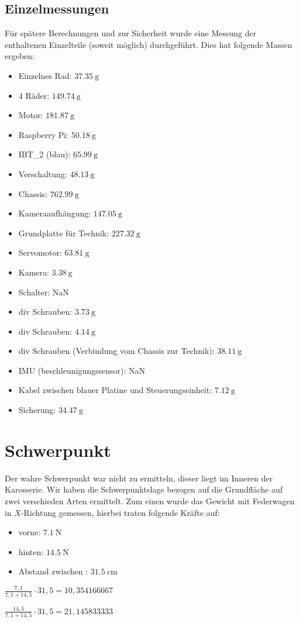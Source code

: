 \documentclass[11pt]{article}
\begin{document}
    \subsection{Einzelmessungen}
    Für spätere Berechnungen und zur Sicherheit wurde eine Messung der enthaltenen Einzelteile (soweit möglich) durchgeführt. Dies hat folgende Massen ergeben:
    \begin{multicols}{2}
    \begin{itemize}
        \item Einzelnes Rad: $\SI{37,35}{\gram}$
        \item 4 Räder: $\SI{149,74}{\gram}$
        \item Motor: $\SI{181,87}{\gram}$
        \item Raspberry Pi: $\SI{50,18}{\gram}$
        \item IBT\_2 (blau): $\SI{65,99}{\gram}$
        \item Verschaltung: $\SI{48,13}{\gram}$
        \item Chassis: $\SI{762,99}{\gram}$
        \item Kameraaufhängung: $\SI{147,05}{\gram}$
        \item Grundplatte für Technik: $\SI{227,32}{\gram}$
        \item Servomotor: $\SI{63,81}{\gram}$
        \item Kamera: $\SI{3,38}{\gram}$
        \item Schalter: NaN
        \item div Schrauben: $\SI{3,73}{\gram}$
        \item div Schrauben: $\SI{4,14}{\gram}$
        \item div Schrauben (Verbindung vom Chassis zur Technik): $\SI{38,11}{\gram}$
        \item IMU (beschleunigungssensor): NaN
        \item Kabel zwischen blauer Platine und Steuerungseinheit: $\SI{7,12}{\gram}$
        \item Sicherung: $\SI{34,47}{\gram}$
    \end{itemize}
    \end{multicols}

\section{Schwerpunkt}
    Der wahre Schwerpunkt war nicht zu ermitteln, dieser liegt im Inneren der Karosserie.
    Wir haben die Schwerpunktslage bezogen auf die Grundfläche auf zwei verschieden Arten ermittelt.
    Zum einen wurde das Gewicht mit Federwagen in $X$-Richtung gemessen, hierbei traten folgende Kräfte auf:
    \begin{itemize}
    \item vorne: $\SI{7,1}{\newton}$
    \item hinten: $\SI{14,5}{\newton}$
    \item Abstand zwischen : $\SI{31,5}{\cm}$
    \end{itemize}
    \item $\frac{7,1}{7,1+14,5}\cdot 31,5 = 10,354166667$
    \item $\frac{14,5}{7,1+14,5}\cdot 31,5 = 21,145833333$
\end{document}
